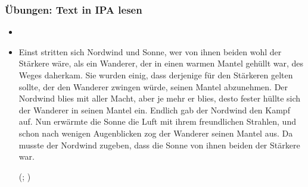 {\begin{frame}
\end{frame}

\begin{frame}
\frametitle{Übungen: Text in IPA lesen}

\begin{itemize}
	\item {\footnotesize {}}
	
	\item {\footnotesize Einst stritten sich Nordwind und Sonne, wer von ihnen beiden wohl der Stärkere wäre, als ein Wanderer, der in einen warmen Mantel gehüllt war, des Weges daherkam. Sie wurden einig, dass derjenige für den Stärkeren gelten sollte, der den Wanderer zwingen würde, seinen Mantel abzunehmen. Der Nordwind blies mit aller Macht, aber je mehr er blies, desto fester hüllte sich der Wanderer in seinen Mantel ein. Endlich gab der Nordwind den Kampf auf. Nun erwärmte die Sonne die Luft mit ihrem freundlichen Strahlen, und schon nach wenigen Augenblicken zog der Wanderer seinen Mantel aus. Da musste der Nordwind zugeben, dass die Sonne von ihnen beiden der Stärkere war.}
	
	\hfill	(\citealp{Pompino95a}; \citealp[88--89]{Kohler99a})

\end{itemize}

\end{frame}

}%



